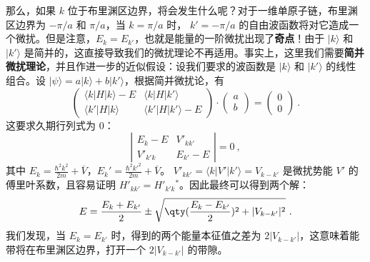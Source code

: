 那么，如果 $k$ 位于布里渊区边界，将会发生什么呢？对于一维单原子链，布里渊区边界为 $-\pi/a$ 和 $\pi/a$，当 $k=\pi/a$ 时， $k'=-\pi/a$ 的自由波函数将对它造成一个微扰。但是注意，$E_k=E_{k'}$，也就是能量的一阶微扰出现了\textbf{奇点}！由于 $|k\rangle$ 和 $|k'\rangle$ 是简并的，这直接导致我们的微扰理论不再适用。事实上，这里我们需要\textbf{简并微扰理论}，并且作进一步的近似假设：设我们要求的波函数是 $|k\rangle$ 和 $|k'\rangle$ 的线性组合。设 $|\psi\rangle=a|k\rangle+b|k'\rangle$，根据简并微扰论，有
\begin{equation}
\begin{pmatrix}
\langle k|H|k\rangle-E & \langle k|H|k'\rangle \\
\langle k'|H|k\rangle & \langle k'|H|k'\rangle - E   
\end{pmatrix}
\cdot
\begin{pmatrix}
a \\ b
\end{pmatrix}=
\begin{pmatrix}
0\\0
\end{pmatrix}~.
\end{equation}
这要求久期行列式为 $0$：
\begin{equation}
\left|
\begin{matrix}
E_k-E & V'_{k k'}\\
V'_{k'k}  & E_{k'}-E
\end{matrix}
\right|
=0~,
\end{equation}
其中 $E_k=\frac{\hbar^2 k^2}{2m}+\overline V$，$E_k'=\frac{\hbar^2 k'^2}{2m}+\overline V$。 $V'_{kk'}=\langle k|V'|k'\rangle=V_{k-k'}$ 是微扰势能 $V'$ 的傅里叶系数，且容易证明 $H'_{kk'}=H'_{k'k}{}^*$。因此最终可以得到两个解：
\begin{equation}
E=\frac{E_k+E_{k'}}{2}\pm \sqrt{\qty(\frac{E_k-E_{k'}}{2})^2+|V_{k-k'}|^2}~.
\end{equation}
我们发现，当 $E_k=E_{k'}$ 时，得到的两个能量本征值之差为 $2|V_{k-k'}|$，这意味着能带将在布里渊区边界，打开一个 $2|V_{k-k'}|$ 的带隙。
